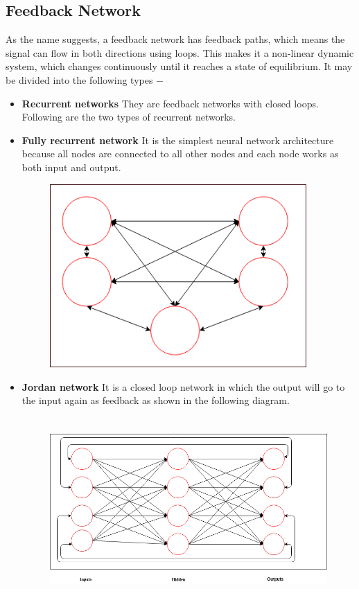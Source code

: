 \documentclass{report}
\begin{document}
\subsection{Feedback Network}
As the name suggests, a feedback network has feedback paths, which means the signal can flow in both directions using loops. This makes it a non-linear dynamic system, which changes continuously until it reaches a state of equilibrium. It may be divided into the following types −

\begin{itemize}
\item \textbf{Recurrent networks} They are feedback networks with closed loops. Following are the two types of recurrent networks.

\item \textbf{Fully recurrent network} It is the simplest neural network architecture because all nodes are connected to all other nodes and each node works as both input and output.

\begin{figure}[htbp]
\centering
\includegraphics[height=7cm]{Pictures/Fully recurrent network.png}
\caption{}
\label{}
\end{figure}

\item \textbf{Jordan network} It is a closed loop network in which the output will go to the input again as feedback as shown in the following diagram.


\begin{figure}[htbp]
\centering
\includegraphics[height=7cm]{Pictures/Jordan network.png}
\caption{}
\label{}
\end{figure}

\end{itemize}
\end{document}
